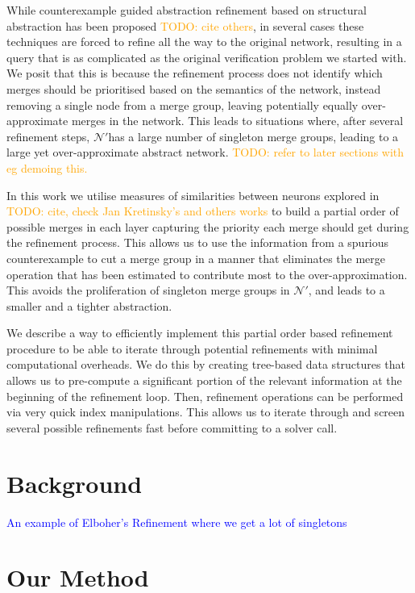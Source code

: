 \documentclass[sigplan,screen,natbib=false]{acmart}
\newcommand{\dmcmt}[1]{\textcolor{blue}{#1}}
\newcommand{\todo}[1]{\textcolor{orange}{TODO: #1}}
\newcommand{\abs}{$\mathcal{N'}$}
\begin{document}
While counterexample guided abstraction refinement based on structural
abstraction has been proposed \cite{cegar-nn} \todo{ cite others}, in
several cases these techniques are forced to refine all the way to the original
network, resulting in a query that is as complicated as the original
verification problem we started with. We posit that this is because the
refinement process does not
identify which merges should be prioritised based on the semantics of the
network, instead removing a single node from a merge group, leaving potentially
equally over-approximate merges in the network. This leads to situations where,
after several refinement steps, \abs has a large number of singleton merge
groups, leading to a large yet over-approximate abstract network. 
\todo{ refer to later sections with eg demoing this.} 

In this work we utilise measures of similarities between neurons explored in
\todo{ cite, check Jan Kretinsky's and others works} to build a partial
order of possible merges in each layer capturing the priority each merge should
get during the refinement process. This allows us to use the information from a
spurious counterexample to cut a merge group in a manner that eliminates the
merge operation that has been estimated to contribute most to the
over-approximation. This avoids the proliferation of singleton merge groups in
\abs, and leads to a smaller and a tighter abstraction.

We describe a way to efficiently implement this partial order based refinement
procedure to be able to iterate through potential refinements with minimal
computational overheads. We do this by creating tree-based data structures that
allows us to pre-compute a significant portion of the relevant information at
the beginning of the refinement loop. Then, refinement operations can be
performed via very quick index manipulations. This allows us to iterate through
and screen several possible refinements fast before committing to a solver call.


\section{Background}

\dmcmt{ 
    An example of Elboher's Refinement where we get a lot of singletons
}


\section{Our Method}
\end{document}
